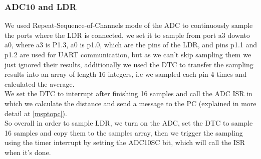 \documentclass{article}
\begin{document}
\subsubsection{ADC10 and LDR}
We used Repeat-Sequence-of-Channels mode of the ADC to continuously sample the ports where the LDR is connected, we set it to sample from port a3 downto a0, where a3 is P1.3, a0 is p1.0, which are the pins of the LDR, and pins p1.1 and p1.2 are used for UART communication, but as we can't skip sampling them we just ignored their results, additionally we used the DTC to transfer the sampling results into an array of length 16 integers, i.e we sampled each pin 4 times and calculated the average.\\
We set the DTC to interrupt after finishing 16 samples and call the ADC ISR in which we calculate the distance and send a message to the PC (explained in more detail at \ref{msptopc}).\\
So overall in order to sample LDR, we turn on the ADC, set the DTC to sample 16 samples and copy them to the samples array, then we trigger the sampling using the timer interrupt by setting the ADC10SC bit, which will call the ISR when it's done.
\end{document}
